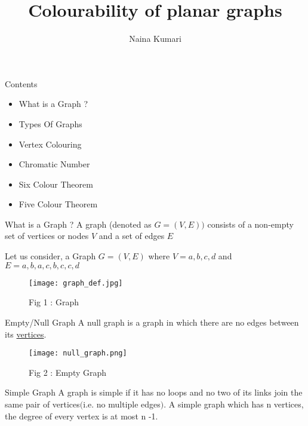 \documentclass[12pt]{beamer}
\title{Colourability of planar graphs}
\author{Naina Kumari}
\institute{\begin{large}
IIT DELHI
\begin{figure}[h]
\texttt{[image: logo\_d]}
\end{figure}

\end{large}}
\begin{document}
\maketitle

\begin{frame}{Contents}
\begin{itemize}
\item What is a Graph ?
\item Types Of Graphs 
\item Vertex Colouring
\item Chromatic Number 
\item Six Colour Theorem 
\item Five Colour Theorem 
\end{itemize}
\end{frame}

\begin{frame}{What is a Graph ?}
A graph (denoted as $G=(V,E))$ consists of a non-empty set of vertices or nodes $V$ and a set of edges $E$ \\
\end{frame}

\begin{frame}
\begin{example}
Let us consider, a Graph $G=(V,E)$ where $V={a,b,c,d}$ and $E={{a,b},{a,c},{b,c},{c,d}}$
\end{example}

\begin{figure}
\texttt{[image: graph\_def.jpg]}
\caption{Fig 1 : Graph }
\end{figure}
\end{frame}


\begin{frame}
\begin{block}{Empty/Null Graph}
A null graph is a graph in which there are no edges between its \hyperlink{page.22}{vertices}. 
\begin{figure}
\texttt{[image: null\_graph.png]}
\caption{Fig 2 : Empty Graph}
\end{figure}
\end{block}
\end{frame}

\begin{frame}
\begin{block}{Simple Graph}
A graph is simple if it has no loops and no two of its links join the same pair of vertices$($i.e. no multiple edges$)$.
A simple graph which has n vertices, the degree of every vertex is at most n -1.
\end{block}
\end{frame}
\end{document}

